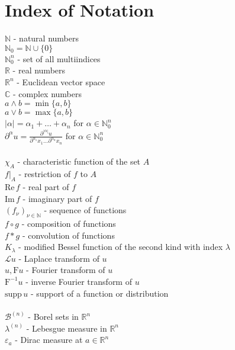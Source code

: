 \documentclass[a4paper, 12pt]{report}
\theoremstyle{cor}
\theoremstyle{remark}
\theoremstyle{definition}
\begin{document}
\chapter*{Index of Notation}

$\mathbb{N}$ - natural numbers\\
$\mathbb{N}_0 = \mathbb{N} \cup \{0\}$\\
$\mathbb{N}_0^n$ - set of all multiindices\\
$\mathbb{R}$ - real numbers\\
$\mathbb{R}^n$ - Euclidean vector space\\
$\mathbb{C}$ - complex numbers\\
$a \wedge b = \min\{a, b\}$\\
$a \vee b = \max\{a, b\}$\\
$|\alpha| = \alpha_1 + \dots +\alpha_n$ for $\alpha \in \mathbb{N}_0^n$\\
$\partial^\alpha u = \frac{\partial^{|\alpha|}u}{\partial^{\alpha_1}x_1\dots\partial^{\alpha_n}x_n}$ for $\alpha \in \mathbb{N}_0^n$\\
\\
$\chi_A$ - characteristic function of the set $A$\\
$f|_A$ - restriction of $f$ to $A$\\
$\text{Re}\,f$ - real part of $f$\\
$\text{Im}\,f$ - imaginary part of $f$\\
$(f_\nu)_{\nu \in \mathbb{N}}$ - sequence of functions\\
$f \circ g$ - composition of functions\\
$f \ast g$ - convolution of functions\\
$K_\lambda$ - modified Bessel function of the second kind with index $\lambda$\\
$\mathcal{L}u$ - Laplace transform of $u$\\
$\hat{u}, \mathrm{F}u$ - Fourier transform of $u$\\
$\mathrm{F}^{-1}u$ - inverse Fourier transform of $u$\\
$\text{supp}\,u$ - support of a function or distribution\\
\\
$\mathcal{B}^{(n)}$ - Borel sets in $\mathbb{R}^n$\\
$\lambda^{(n)}$ - Lebesgue measure in $\mathbb{R}^n$\\
$\varepsilon_a$ - Dirac measure at $a \in \mathbb{R}^n$\\
\end{document}
